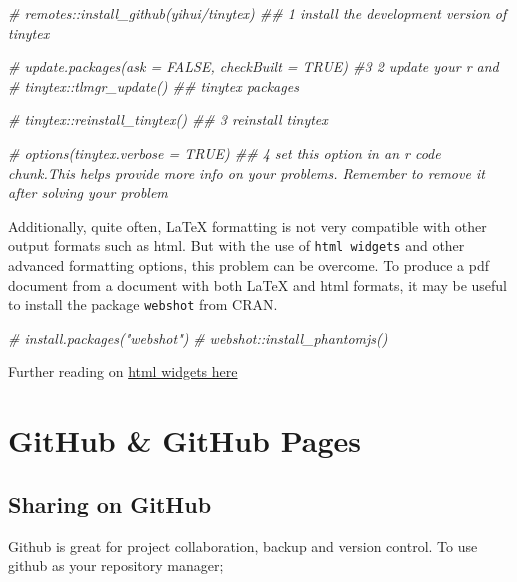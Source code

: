 \documentclass[
]{book}
\newenvironment{Shaded}{\begin{snugshade}}{\end{snugshade}}
\newcommand{\CommentTok}[1]{\textcolor[rgb]{0.56,0.35,0.01}{\textit{#1}}}
\begin{document}
\begin{Shaded}
\begin{Highlighting}[]
\CommentTok{\# remotes::install\_github(\textquotesingle{}yihui/tinytex\textquotesingle{}) \#\# 1 install the development version of tinytex}

\CommentTok{\# update.packages(ask = FALSE, checkBuilt = TRUE) \#3 2 update your r and}
\CommentTok{\# tinytex::tlmgr\_update() \#\# tinytex packages}

\CommentTok{\# tinytex::reinstall\_tinytex()  \#\# 3 reinstall tinytex}

\CommentTok{\# options(tinytex.verbose = TRUE) \#\# 4 set this option in an r code chunk.This helps provide more info on your problems. Remember to remove it after solving your problem}
\end{Highlighting}
\end{Shaded}

Additionally, quite often, LaTeX formatting is not very compatible with other output formats such as html. But with the use of \texttt{html\ widgets} and other advanced formatting options, this problem can be overcome.
To produce a pdf document from a document with both LaTeX and html formats, it may be useful to install the package \texttt{webshot} from CRAN.

\begin{Shaded}
\begin{Highlighting}[]
\CommentTok{\# install.packages("webshot")  }
\CommentTok{\# webshot::install\_phantomjs() }
\end{Highlighting}
\end{Shaded}

Further reading on \href{https://bookdown.org/yihui/bookdown/html-widgets.html}{html widgets here}

\hypertarget{github-github-pages}{%
\chapter{GitHub \& GitHub Pages}\label{github-github-pages}}

\hypertarget{sharing-on-github}{%
\section{Sharing on GitHub}\label{sharing-on-github}}

Github is great for project collaboration, backup and version control.
To use github as your repository manager;
\end{document}
